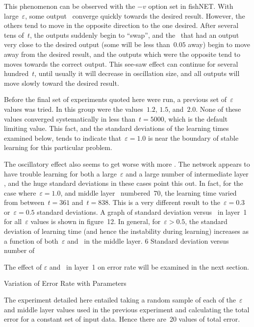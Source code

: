This phenomenon can be observed with the $-v$ option set in
fishNET.
With large~$\varepsilon$, some output \neus\ converge quickly
towards the desired result.
However, the others tend to move in the opposite direction to the
one desired.
After several tens of~$t$, the outputs suddenly begin to ``swap'',
and the \neus\ that had an output very close to the desired output
(some will be less than~$0.05$ away) begin to move away from the
desired result, and the outputs which were the opposite tend to
moves towards the correct output.
This see-saw effect can continue for several hundred~$t$, until
usually it will decrease in oscillation size, and all outputs will move 
slowly toward the desired result.

Before the final set of experiments quoted here were run, a previous
set of~$\varepsilon$ values was tried.
In this group were the values~$1.2$, $1.5$, and~$2.0$.
None of these values converged systematically in less than~$t =
5000$, which is the default limiting value.
This fact, and the standard deviations of the learning times examined
below, tends to indicate that~$\varepsilon = 1.0$ is near the boundary
of stable learning for this particular problem.

The oscillatory effect also seems to get worse with more \neus.
The network appears to have trouble learning for both a
large~$\varepsilon$ and a large number of intermediate layer \neus,
and the huge standard deviations in these cases point this out.
In fact, for the case where~$\varepsilon = 1.0$, and middle layer
\neus\ numbered~70, the learning time varied from 
between~$t=361$ and~$t=838$.
This is a very different result to the~$\varepsilon = 0.3$ 
or~$\varepsilon = 0.5$ standard deviations.
A graph of standard deviation versus \neus\ in layer~1 for
all~$\varepsilon$ values is shown in figure~12.
In general, for~$\varepsilon > 0.5$, the standard deviation of
learning time (and hence the instability during learning) increases
as a function of both~$\varepsilon$ and \neus\ in the middle layer.
 {6} {Standard deviation versus number of \neus}

The effect of $\varepsilon$ and \neus\ in layer~1 on error rate will
be examined in the next section.

\sec Variation of Error Rate with Parameters

The experiment detailed here entailed taking a random sample of each
of the~$\varepsilon$ and middle layer values used in the previous
experiment and calculating the total error for a constant set of
input data.
Hence there are~20 values of total error.


